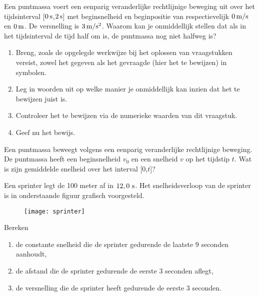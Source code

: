 \documentclass{ximera}
\begin{document}
\begin{exercise} Een puntmassa voert een eenparig veranderlijke rechtlijnige
beweging uit over het tijdsinterval [$0\rm\,s$,$2\rm\,s$] met
beginsnelheid en beginpositie van respectievelijk $0\rm\,m/s$ en
$0\rm\,m$. De versnelling is $3\rm\,m/s^2$. Waarom kan je
onmiddellijk stellen dat als in het tijdsinterval de tijd half om
is, de puntmassa nog niet halfweg is?
\begin{enumerate}
    \item Breng, zoals de opgelegde werkwijze bij het oplossen van
    vraag\-stuk\-ken vereist, zowel het gegeven als het gevraagde (hier
    het te bewijzen) in symbolen.
    \item Leg in woorden uit op welke manier je onmiddellijk kan
    inzien dat het te bewijzen juist is.
    \item Controleer het te bewijzen via de numerieke waarden van
    dit vraagstuk.
    \item Geef nu het bewijs.
\end{enumerate}

\end{exercise}

\begin{exercise} Een puntmassa beweegt volgens een eenparig veranderlijke
rechtlijnige beweging. De puntmassa heeft een beginsnelheid $v_0$ en
een snelheid $v$ op het tijdstip $t$. Wat is zijn gemiddelde
snelheid over het interval [0,$t$]?

\end{exercise}

\begin{exercise} Een sprinter legt de 100 meter af in
$12,0~\rm s$. Het snelheidsverloop van de sprinter is in
onderstaande figuur grafisch voorgesteld.
\begin{figure}[h]
\begin{center}
\texttt{[image: sprinter]}
\end{center}
\end{figure}
\newline
Bereken
\begin{enumerate}
\item de constante snelheid die de sprinter gedurende de laatste 9
seconden aanhoudt,
\item de afstand die de sprinter gedurende de eerste 3 seconden
aflegt,
\item de versnelling die de sprinter heeft gedurende de eerste 3 seconden.
\end{enumerate}

\end{exercise}
\end{document}
